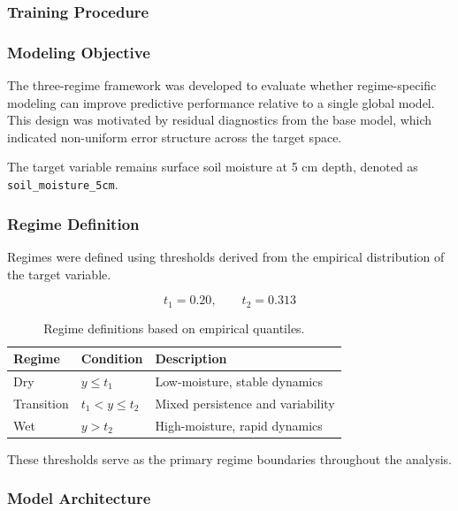 \subsubsection*{Training Procedure}

\subsubsection*{Modeling Objective}

The three-regime framework was developed to evaluate whether regime-specific modeling can improve predictive performance relative to a single global model. This design was motivated by residual diagnostics from the base model, which indicated non-uniform error structure across the target space.

The target variable remains surface soil moisture at 5 cm depth, denoted as \texttt{soil\_moisture\_5cm}.

\subsubsection*{Regime Definition}

Regimes were defined using thresholds derived from the empirical distribution of the target variable.

\begin{equation}
t_1 = 0.20, \qquad t_2 = 0.313
\end{equation}

\begin{table}[H]
\centering
\begin{tabular}{lll}
\toprule
\textbf{Regime} & \textbf{Condition} & \textbf{Description} \\
\midrule
Dry & $y \le t_1$ & Low-moisture, stable dynamics \\
Transition & $t_1 < y \le t_2$ & Mixed persistence and variability \\
Wet & $y > t_2$ & High-moisture, rapid dynamics \\
\bottomrule
\end{tabular}
\caption{Regime definitions based on empirical quantiles.}
\end{table}

These thresholds serve as the primary regime boundaries throughout the analysis.

\subsubsection*{Model Architecture}

